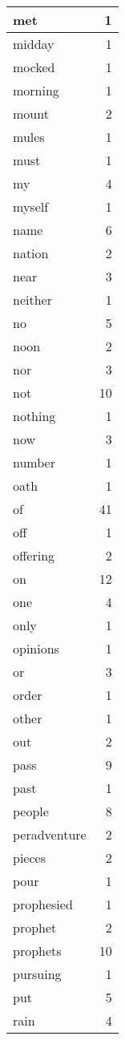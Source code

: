 \begin{center}
\begin{longtable}{l|r}
met & 1\\ \hline 
midday & 1\\ \hline 
mocked & 1\\ \hline 
morning & 1\\ \hline 
mount & 2\\ \hline 
mules & 1\\ \hline 
must & 1\\ \hline 
my & 4\\ \hline 
myself & 1\\ \hline 
name & 6\\ \hline 
nation & 2\\ \hline 
near & 3\\ \hline 
neither & 1\\ \hline 
no & 5\\ \hline 
noon & 2\\ \hline 
nor & 3\\ \hline 
not & 10\\ \hline 
nothing & 1\\ \hline 
now & 3\\ \hline 
number & 1\\ \hline 
oath & 1\\ \hline 
of & 41\\ \hline 
off & 1\\ \hline 
offering & 2\\ \hline 
on & 12\\ \hline 
one & 4\\ \hline 
only & 1\\ \hline 
opinions & 1\\ \hline 
or & 3\\ \hline 
order & 1\\ \hline 
other & 1\\ \hline 
out & 2\\ \hline 
pass & 9\\ \hline 
past & 1\\ \hline 
people & 8\\ \hline 
peradventure & 2\\ \hline 
pieces & 2\\ \hline 
pour & 1\\ \hline 
prophesied & 1\\ \hline 
prophet & 2\\ \hline 
prophets & 10\\ \hline 
pursuing & 1\\ \hline 
put & 5\\ \hline 
rain & 4\\ \hline 

\end{longtable}
\end{center}
